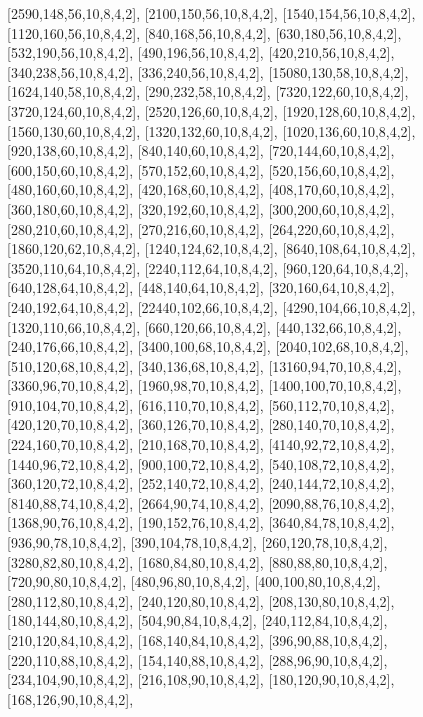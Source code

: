 \documentclass[12pt]{amsart}
\begin{document}
[2590,148,56,10,8,4,2],   [2100,150,56,10,8,4,2],   [1540,154,56,10,8,4,2],   [1120,160,56,10,8,4,2],   [840,168,56,10,8,4,2],   [630,180,56,10,8,4,2],
[532,190,56,10,8,4,2],   [490,196,56,10,8,4,2],   [420,210,56,10,8,4,2],   [340,238,56,10,8,4,2],   [336,240,56,10,8,4,2],   [15080,130,58,10,8,4,2],
[1624,140,58,10,8,4,2],   [290,232,58,10,8,4,2],   [7320,122,60,10,8,4,2],   [3720,124,60,10,8,4,2],   [2520,126,60,10,8,4,2],   [1920,128,60,10,8,4,2],
[1560,130,60,10,8,4,2],   [1320,132,60,10,8,4,2],   [1020,136,60,10,8,4,2],   [920,138,60,10,8,4,2],   [840,140,60,10,8,4,2],   [720,144,60,10,8,4,2],
[600,150,60,10,8,4,2],   [570,152,60,10,8,4,2],   [520,156,60,10,8,4,2],   [480,160,60,10,8,4,2],   [420,168,60,10,8,4,2],   [408,170,60,10,8,4,2],
[360,180,60,10,8,4,2],   [320,192,60,10,8,4,2],   [300,200,60,10,8,4,2],   [280,210,60,10,8,4,2],   [270,216,60,10,8,4,2],   [264,220,60,10,8,4,2],
[1860,120,62,10,8,4,2],   [1240,124,62,10,8,4,2],   [8640,108,64,10,8,4,2],   [3520,110,64,10,8,4,2],   [2240,112,64,10,8,4,2],   [960,120,64,10,8,4,2],
[640,128,64,10,8,4,2],   [448,140,64,10,8,4,2],   [320,160,64,10,8,4,2],   [240,192,64,10,8,4,2],   [22440,102,66,10,8,4,2],   [4290,104,66,10,8,4,2],
[1320,110,66,10,8,4,2],   [660,120,66,10,8,4,2],   [440,132,66,10,8,4,2],   [240,176,66,10,8,4,2],   [3400,100,68,10,8,4,2],   [2040,102,68,10,8,4,2],
[510,120,68,10,8,4,2],   [340,136,68,10,8,4,2],   [13160,94,70,10,8,4,2],   [3360,96,70,10,8,4,2],   [1960,98,70,10,8,4,2],   [1400,100,70,10,8,4,2],
[910,104,70,10,8,4,2],   [616,110,70,10,8,4,2],   [560,112,70,10,8,4,2],   [420,120,70,10,8,4,2],   [360,126,70,10,8,4,2],   [280,140,70,10,8,4,2],
[224,160,70,10,8,4,2],   [210,168,70,10,8,4,2],   [4140,92,72,10,8,4,2],   [1440,96,72,10,8,4,2],   [900,100,72,10,8,4,2],   [540,108,72,10,8,4,2],
[360,120,72,10,8,4,2],   [252,140,72,10,8,4,2],   [240,144,72,10,8,4,2],   [8140,88,74,10,8,4,2],   [2664,90,74,10,8,4,2],   [2090,88,76,10,8,4,2],
[1368,90,76,10,8,4,2],   [190,152,76,10,8,4,2],   [3640,84,78,10,8,4,2],   [936,90,78,10,8,4,2],   [390,104,78,10,8,4,2],   [260,120,78,10,8,4,2],   [3280,82,80,10,8,4,2],
[1680,84,80,10,8,4,2],   [880,88,80,10,8,4,2],   [720,90,80,10,8,4,2],   [480,96,80,10,8,4,2],   [400,100,80,10,8,4,2],   [280,112,80,10,8,4,2],   [240,120,80,10,8,4,2],
[208,130,80,10,8,4,2],   [180,144,80,10,8,4,2],   [504,90,84,10,8,4,2],   [240,112,84,10,8,4,2],   [210,120,84,10,8,4,2],   [168,140,84,10,8,4,2],   [396,90,88,10,8,4,2],
[220,110,88,10,8,4,2],   [154,140,88,10,8,4,2],   [288,96,90,10,8,4,2],   [234,104,90,10,8,4,2],   [216,108,90,10,8,4,2],   [180,120,90,10,8,4,2],   [168,126,90,10,8,4,2],
\end{document}
